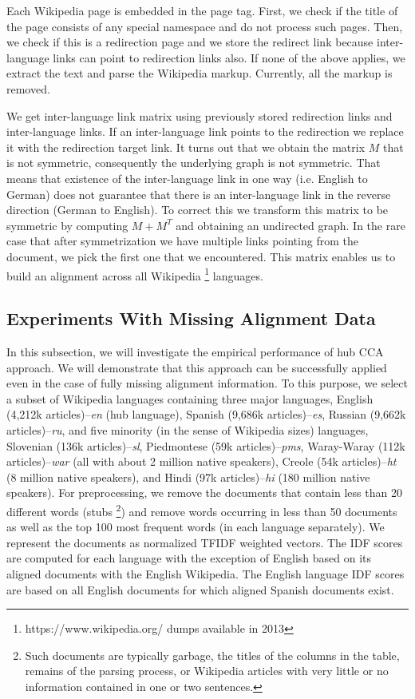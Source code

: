 \documentclass[twoside,11pt]{article}
\begin{document}
Each Wikipedia page is embedded in the page tag. First, we check if the title of the page consists of any special namespace and do not process such pages. Then, we check if this is a redirection page and we store the redirect link because inter-language links can point to redirection links also. If none of the above applies, we extract the text and parse the Wikipedia markup. Currently, all the markup is removed.

We get inter-language link matrix using previously stored redirection links and inter-language links. If an inter-language link points to the redirection we replace it with the redirection target link. It turns out that we obtain the matrix $M$ that is not symmetric, consequently the underlying graph is not symmetric. That means that existence of the inter-language link in one way (i.e. English to German) does not guarantee that there is an inter-language link in the reverse direction (German to English). To correct this we transform this matrix to be symmetric by computing $M+M^T$ and obtaining an undirected graph. In the rare case that after symmetrization we have multiple links pointing from the document, we pick the first one that we encountered. This matrix enables us to build an alignment across all Wikipedia \footnote{https://www.wikipedia.org/ dumps available in 2013} languages.

\subsection{Experiments With Missing Alignment Data}\label{experiments:hubcca}

 In this subsection, we will investigate the empirical performance of hub CCA approach. We will demonstrate that this approach can be successfully applied even in the case of fully missing alignment information.
 To this purpose, we select a subset of Wikipedia languages containing three major languages, English (4,212k articles)--\emph{en} (hub language), Spanish (9,686k articles)--\emph{es}, Russian (9,662k articles)--\emph{ru}, and five minority (in the sense of Wikipedia sizes) languages, Slovenian (136k articles)--\emph{sl}, Piedmontese (59k articles)--\emph{pms}, Waray-Waray (112k articles)--\emph{war} (all with about 2 million native speakers), Creole (54k articles)--\emph{ht} (8 million native speakers), and Hindi (97k articles)--\emph{hi} (180 million native speakers). For preprocessing, we remove the documents that contain less than 20 different words (stubs \footnote{Such documents are typically garbage, the titles of the columns in the table, remains of the parsing process, or Wikipedia articles with very little or no information contained in one or two sentences.}) and remove words occurring in less than 50 documents as well as the top 100 most frequent words (in each language separately). We represent the documents as normalized TFIDF\cite{Salton88term-weightingapproaches} weighted vectors. The IDF scores are computed for each language with the exception of English based on its aligned documents with the English Wikipedia. The English language IDF scores are based on all English documents for which aligned Spanish documents exist.
 
\end{document}

